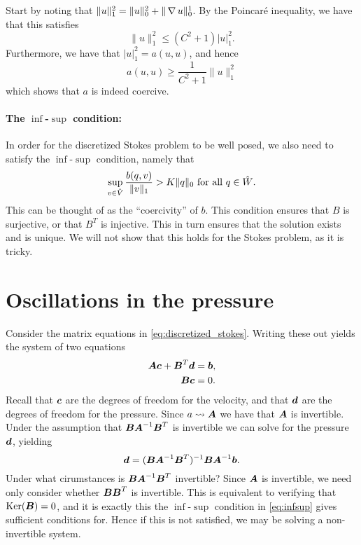 Start by noting that \(\| u \|_1^2 = \| u \|_0^2 + \| \operatorname{\mathop{}\!\nabla} u \|_0^1 \). By the
Poincar\'e inequality, we have that this satisfies
\begin{equation}
    \| u \|_1^2 \leq (C^2 + 1 )|u|_1^2.
\end{equation}
Furthermore, we have that \( |u|_1^2 = a(u, u) \), and hence
\begin{equation}
    a(u, u) \geq \frac{1}{C^2 + 1}\|u\|_1^2
\end{equation}
which shows that \( a \) is indeed coercive.

\paragraph{The \(\inf\)-\(\sup\) condition:}

In order for the discretized Stokes problem to be well posed, we also need to
satisfy the \( \inf \)-\(\sup\) condition, namely that
\begin{equation}
    \label{eq:infsup}
    \sup_{v \in \hat{V}} \frac{b(q, v)}{\|v\|_1} > K \| q \|_0 \text{ for all } q \in \hat{W}.
\end{equation}
This can be thought of as the ``coercivity'' of \( b \). This condition ensures
that \( B \) is surjective, or that \( B^T \) is injective. This in turn
ensures that the solution exists and is unique. We will not show that this
holds for the Stokes problem, as it is tricky.

\section{Oscillations in the pressure}

Consider the matrix equations in \vref{eq:discretized_stokes}. Writing these
out yields the system of two equations
\begin{align}
    \boldsymbol{A} \boldsymbol{c} + \boldsymbol{B}^T \boldsymbol{d} &= \boldsymbol{b}, \\
    \boldsymbol{B}\boldsymbol{c} &= 0.
\end{align}
Recall that \( \boldsymbol{c} \) are the degrees of freedom for the velocity, and that \(
\boldsymbol{d} \) are the degrees of freedom for the pressure. Since \( a \rightsquigarrow
\boldsymbol{A} \) we have that \( \boldsymbol{A} \) is invertible. Under the assumption that \(\boldsymbol{B}
\boldsymbol{A}^{-1} \boldsymbol{B}^T\) is invertible we can solve for the pressure \( \boldsymbol{d} \), yielding
\begin{equation}
    \boldsymbol{d} = (\boldsymbol{B}\boldsymbol{A}^{-1}\boldsymbol{B}^T)^{-1} \boldsymbol{B}\boldsymbol{A}^{-1}\boldsymbol{b}.
\end{equation}
Under what cirumstances is \( \boldsymbol{B}\boldsymbol{A}^{-1}\boldsymbol{B}^T \) invertible? Since \( \boldsymbol{A} \) is
invertible, we need only consider whether \( \boldsymbol{B}\boldsymbol{B}^T \) is invertible. This is
equivalent to verifying that \( \operatorname{Ker}(\boldsymbol{B}) = 0 \), and it is exactly this the \(
\inf\)-\(\sup\) condition in \vref{eq:infsup} gives sufficient conditions for.
Hence if this is not satisfied, we may be solving a non-invertible system.

